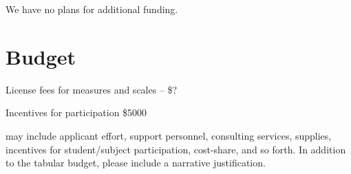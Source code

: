 \documentclass[12pt]{article}
\begin{document}
We have no plans for additional funding.

\section{Budget}

License fees for measures and scales -- \$?

Incentives for participation \$5000

may include applicant effort, support personnel, consulting services,
supplies, incentives for student/subject participation, cost-share,
and so forth. In addition to the tabular budget, please include a
narrative justification.



\end{document}
